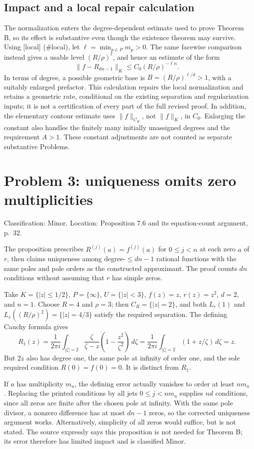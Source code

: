 \documentclass[10pt]{article}
\begin{document}
\subsection*{Impact and a local repair calculation}
The normalization enters the degree-dependent estimate used to prove Theorem B, so its effect is substantive even though the existence theorem may survive. Using [local] (\#local), let \(\ell=\min_{p\in P}m_p>0\). The same facewise comparison instead gives a usable level \((R/\rho)^\ell\), and hence an estimate of the form \[\|f-R_{dn-1}\|_K\le C_0(R/\rho)^{-\ell n}.\] In terms of degree, a possible geometric base is \(B=(R/\rho)^{\ell/d}>1\), with a suitably enlarged prefactor. This calculation repairs the local normalization and retains a geometric rate, conditional on the existing separation and regularization inputs; it is not a certification of every part of the full revised proof. In addition, the elementary contour estimate uses \(\|f\|_{C_R}\), not \(\|f\|_K\), in \(C_0\). Enlarging the constant also handles the finitely many initially unassigned degrees and the requirement \(A>1\). These constant adjustments are not counted as separate substantive Problems.\par
\section*{Problem 3: uniqueness omits zero multiplicities}
Classification: Minor. Location: Proposition 7.6 and its equation-count argument, p. 32.\par
The proposition prescribes \(R^{(j)}(a)=f^{(j)}(a)\) for \(0\le j<n\) at each zero \(a\) of \(r\), then claims uniqueness among degree-\(\le dn-1\) rational functions with the same poles and pole orders as the constructed approximant. The proof counts \(dn\) conditions without assuming that \(r\) has simple zeros.\par
Take \(K=\{|z|\le1/2\}\), \(P=\{\infty\}\), \(U=\{|z|<3\}\), \(f(z)=z\), \(r(z)=z^2\), \(d=2\), and \(n=1\). Choose \(R=4\) and \(\rho=3\); then \(C_R=\{|z|=2\}\), and both \(L_r(1)\) and \(L_r((R/\rho)^2)=\{|z|=4/3\}\) satisfy the required separation. The defining Cauchy formula gives \[R_1(z)=\frac{1}{2\pi i}\int_{|\zeta|=2}
 \frac{\zeta}{\zeta-z}\left(1-\frac{z^2}{\zeta^2}\right)\,d\zeta
 =\frac{1}{2\pi i}\int_{|\zeta|=2}(1+z/\zeta)\,d\zeta=z.\] But \(2z\) also has degree one, the same pole at infinity of order one, and the sole required condition \(R(0)=f(0)=0\). It is distinct from \(R_1\).\par
If \(a\) has multiplicity \(m_a\), the defining error actually vanishes to order at least \(nm_a\). Replacing the printed conditions by all jets \(0\le j<nm_a\) supplies \(nd\) conditions, since all zeros are finite after the chosen pole at infinity. With the same pole divisor, a nonzero difference has at most \(dn-1\) zeros, so the corrected uniqueness argument works. Alternatively, simplicity of all zeros would suffice, but is not stated. The source expressly says this proposition is not needed for Theorem B; its error therefore has limited impact and is classified Minor.\par
\end{document}
